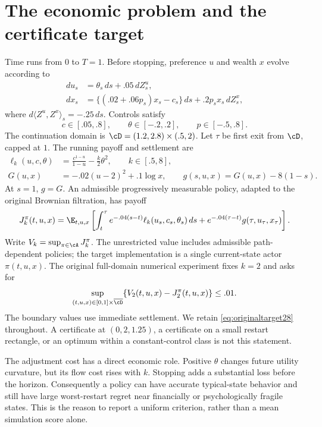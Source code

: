 \section{The economic problem and the certificate target}\label{sec:model28}
Time runs from $0$ to $T=1$. Before stopping, preference $u$ and wealth $x$ evolve according to
\begin{align}
 du_s&=\theta_s\,ds+.05\,dZ^u_s,\\
 dx_s&=\{(.02+.06p_s)x_s-c_s\}\,ds+.2p_sx_s\,dZ^x_s,
\end{align}
where $d\langle Z^u,Z^x\rangle_s=-.25\,ds$. Controls satisfy
\begin{equation}
 c\in[.05,.8],\qquad \theta\in[-.2,.2],\qquad p\in[-.5,.8].
\end{equation}
The continuation domain is $\cD=(1.2,2.8)\times(.5,2)$. Let $\tau$ be first exit from $\cD$, capped at $1$. The running payoff and settlement are
\begin{align}
 \ell_k(u,c,\theta)&=\frac{c^{1-u}}{1-u}-\frac{k}{2}\theta^2,\qquad k\in[.5,8],\\
 G(u,x)&=-.02(u-2)^2+.1\log x,\qquad
 g(s,u,x)=G(u,x)-8(1-s).
\end{align}
At $s=1$, $g=G$. An admissible progressively measurable policy, adapted to the original Brownian filtration, has payoff
\begin{equation}\label{eq:payoff28}
 J_k^\pi(t,u,x)=\E_{t,u,x}\left[\int_t^\tau e^{-.04(s-t)}\ell_k(u_s,c_s,\theta_s)\,ds+e^{-.04(\tau-t)}g(\tau,u_\tau,x_\tau)\right].
\end{equation}
Write $V_k=\sup_{\pi\in\cA}J_k^\pi$. The unrestricted value includes admissible path-dependent policies; the target implementation is a single current-state actor $\pi(t,u,x)$. The original full-domain numerical experiment fixes $k=2$ and asks for
\begin{equation}\label{eq:originaltarget28}
 \sup_{(t,u,x)\in[0,1]\times\overline{\cD}}\{V_2(t,u,x)-J_2^\pi(t,u,x)\}\le .01.
\end{equation}
The boundary values use immediate settlement. We retain \eqref{eq:originaltarget28} throughout. A certificate at $(0,2,1.25)$, a certificate on a small restart rectangle, or an optimum within a constant-control class is not this statement.

The adjustment cost has a direct economic role. Positive $\theta$ changes future utility curvature, but its flow cost rises with $k$. Stopping adds a substantial loss before the horizon. Consequently a policy can have accurate typical-state behavior and still have large worst-restart regret near financially or psychologically fragile states. This is the reason to report a uniform criterion, rather than a mean simulation score alone.

